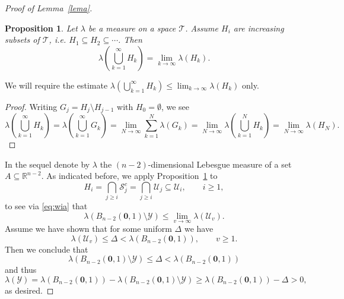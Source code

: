 \documentclass[10pt]{amsart}
\newtheorem{proposition}{Proposition}
\theoremstyle{definition}
\newcommand{\R}{\mathbb{R}}
\begin{document}
\begin{proof}[Proof of Lemma~\ref{lema}]
\begin{proposition}  \label{pp}
	Let $\lambda$ be a measure on a space $\mathcal{T}$.
	Assume $H_i$ are increasing subsets of $\mathcal{T}$, i.e.
	$H_1\subseteq H_2 \subseteq \cdots$. Then
	\[
	\lambda\left(\bigcup_{k=1}^{\infty} H_k\right) = \lim_{k\to\infty} \lambda(H_k).
	\]
\end{proposition}

We will require the estimate $\lambda\left(\bigcup_{k=1}^{\infty} H_k\right) \le \lim_{k\to\infty} \lambda(H_k)$ only.

\begin{proof}
	Writing $G_j=H_j\setminus H_{j-1}$ with $H_0=\emptyset$, we see
    \begin{equation*}
	\lambda\left(\bigcup_{k=1}^{\infty} H_k\right)= \lambda\left(\bigcup_{k=1}^{\infty} G_k\right)= \lim_{N\to\infty} \sum_{k=1}^{N} \lambda(G_k)= \lim_{N\to\infty}  \lambda\left(\bigcup_{k=1}^{N} H_k\right)= \lim_{N\to\infty}  \lambda(H_N).
	\end{equation*}
	\end{proof}

In the sequel denote by $\lambda$ the $(n-2)$-dimensional Lebesgue measure of a set $A\subseteq \R^{n-2}$.
As indicated before, we apply Proposition~\ref{pp} to
\[
H_i= \bigcap_{j\ge i} \mathcal{S}_j^{c}= \bigcap_{j\ge i} \mathcal{U}_j \subseteq \mathcal{U}_i, \qquad i\ge 1,
\]
to see via \eqref{eq:wia} that
\[
\lambda(B_{n-2}(\boldsymbol{0},1)\setminus \mathcal{Y})\le \lim_{v\to\infty} \lambda(\mathcal{U}_v).
\]
Assume we have shown that for some uniform $\Delta$ we have
\begin{equation}  \label{eq:IND}
\lambda(\mathcal{U}_v)\le \Delta< \lambda(B_{n-2}(\boldsymbol{0},1)), \qquad v\ge 1.
\end{equation}
Then we conclude that $$\lambda(B_{n-2}(\boldsymbol{0},1)\setminus \mathcal{Y})\le \Delta<\lambda(B_{n-2}(\boldsymbol{0},1))$$ and thus
\[
\lambda(\mathcal{Y}) = \lambda(B_{n-2}(\boldsymbol{0},1)) - \lambda(B_{n-2}(\boldsymbol{0},1)\setminus \mathcal{Y})\ge \lambda(B_{n-2}(\boldsymbol{0},1)) - \Delta > 0,
\]
as desired.


\end{proof}
\end{document}
